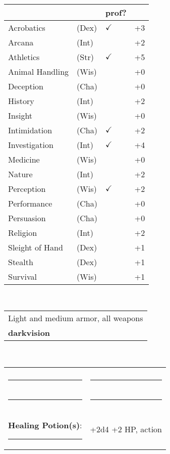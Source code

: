 \documentclass[twocolumn]{article}
\begin{document}
\\
\noindent\begin{tabular}{llll}
 & & prof? & \\
\hline
Acrobatics & (Dex) & $\checkmark$ &+3 \\
Arcana & (Int) &  & +2 \\ 
Athletics & (Str) & $\checkmark$ & +5\\
Animal Handling & (Wis) &  & +0\\
Deception & (Cha) &  & +0\\
History & (Int) &  & +2 \\
Insight & (Wis) &  & +0 \\
Intimidation & (Cha) & $\checkmark$ & +2 \\
Investigation & (Int) & $\checkmark$ & +4 \\
Medicine & (Wis) &  & +0 \\
Nature & (Int) &  & +2 \\
Perception & (Wis) & $\checkmark$ & +2 \\
Performance & (Cha) &  & +0 \\
Persuasion & (Cha) &  & +0 \\
Religion & (Int) &  & +2 \\
Sleight of Hand & (Dex) &  & +1 \\
Stealth & (Dex) &  & +1 \\
Survival & (Wis) &  & +1 \\
\hline
\end{tabular}
\vspace{12pt}

\\
\noindent\begin{tabular}{|m{3.1in}|}
\hline
Light and medium armor, all weapons \\
\textbf{darkvision} \\
\hline
\end{tabular}
\vspace{12pt}


\\
\noindent\begin{tabular}{|ll|}
\hline&\\
\rule{1.4in}{.2pt}&\rule{1.4in}{.2pt}\\
\rule{1.4in}{.2pt}&\rule{1.4in}{.2pt}\\
\textbf{Healing Potion(s)}: \rule{.2in}{.2pt}& +2d4 +2 HP, {\sc action}\\
\hline
\end{tabular}
\vspace{12pt}
\end{document}
